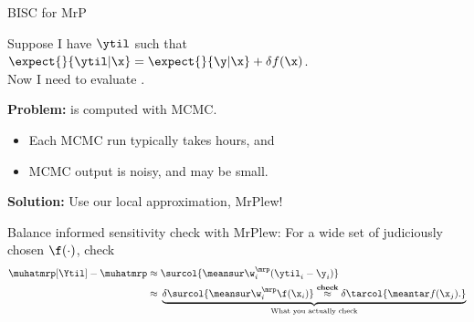 
\begin{frame}[t]{BISC for MrP}

Suppose I have
$\ytil$ such that $\expect{}{\ytil \vert \x} = \expect{}{\y \vert \x} + \delta f(\x)$.\\
Now I need to evaluate \surcol{$\muhatmrp[\Ytil] - \muhatmrp$}.
\pause

\textbf{Problem:} \surcol{$\muhatmrp[\cdot]$} is computed with MCMC.
%
\begin{itemize}
\item Each MCMC run typically takes hours, and
\item MCMC output is noisy, and \surcol{$\muhatmrp[\Ytil] - \muhatmrp$} may be small.
\end{itemize}
%
\pause
\textbf{Solution:} Use our local approximation, MrPlew!

\begin{block}{Balance informed sensitivity check with MrPlew:}
For a wide set of judiciously chosen $\f(\cdot)$, check
$$
\begin{aligned}
\muhatmrp[\Ytil] - \muhatmrp \approx{}&
    \surcol{\meansur \w_i^\mrp (\ytil_i - \y_i)}
    \\\approx{}&
    \underbrace{
        \delta  \surcol{\meansur \w_i^\mrp \f(\x_i)}
            \overset{\textrm{\textbf{check}}}{\approx}
        \delta \tarcol{\meantar f(\x_j).}
    }_{\textrm{What you actually check}}
\end{aligned}
$$
\end{block}



\end{frame}



